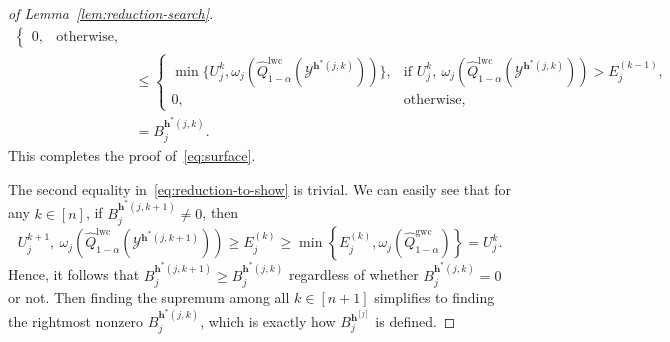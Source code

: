 \begin{proof}[of Lemma~\ref{lem:reduction-search}]
\begin{align*}
\begin{cases}
0, & \text{otherwise},
 \end{cases}\\
&\leq \begin{cases}
\min\!\bigl\{U^{k}_j, \omega_j(\hat{Q}^{\mathrm{lwc}}_{1-\alpha}(\mathcal{Y}^{\mathbf{h}^*(j,k)}))\bigr\}, 
& \text{if } U^{k}_j,\ \omega_j(\hat{Q}^{\mathrm{lwc}}_{1-\alpha}(\mathcal{Y}^{\mathbf{h}^*(j,k)})) > E^{(k-1)}_j,\\[0.4em]
0, & \text{otherwise},
\end{cases}\\
&=B^{\mathbf{h}^*(j,k)}_j.
\end{align*}
This completes the proof of~\eqref{eq:surface}. 

The second equality in~\eqref{eq:reduction-to-show}
is trivial. We can easily see that for any $k \in [n]$, if $B^{\mathbf{h}^*(j,k+1)}_j \neq 0$, then
\[
U^{k+1}_j,\ \omega_j(\hat{Q}^{\mathrm{lwc}}_{1-\alpha}(\mathcal{Y}^{\mathbf{h}^*(j,k+1)})) \geq E^{(k)}_j \geq \min\left\{E^{(k)}_j, \omega_j(\hat{Q}^{\mathrm{gwc}}_{1-\alpha})\right\} = U^k_j.
\]
Hence, it follows that $B^{\mathbf{h}^*(j,k+1)}_j \geq B^{\mathbf{h}^*(j,k)}_j$ regardless of whether $B^{\mathbf{h}^*(j,k)}_j = 0$ or not. Then finding the supremum among all $k\in [n+1]$ simplifies to finding the rightmost nonzero $B_j^{\mathbf{h}^*(j,k)}$, which is exactly how $B^{\mathbf{h}^{[j]}}_j$ is defined.


\end{proof}
